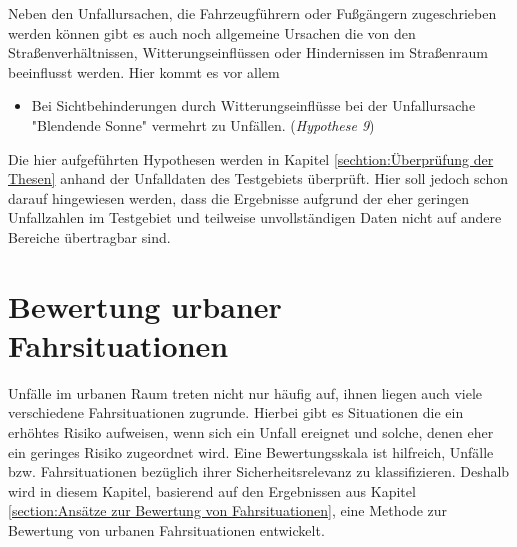 Neben den Unfallursachen, die Fahrzeugführern oder Fußgängern zugeschrieben werden können gibt es auch noch allgemeine Ursachen die von den Straßenverhältnissen, Witterungseinflüssen oder Hindernissen im Straßenraum beeinflusst werden. Hier kommt es vor allem 

\begin{itemize}	
	\item Bei Sichtbehinderungen durch Witterungseinflüsse bei der Unfallursache "Blendende Sonne" vermehrt zu Unfällen. (\textit{Hypothese 9})
\end{itemize}

Die hier aufgeführten Hypothesen werden in Kapitel \ref{sechtion:Überprüfung der Thesen} anhand der Unfalldaten des Testgebiets überprüft. Hier soll jedoch schon darauf hingewiesen werden, dass die Ergebnisse aufgrund der eher geringen Unfallzahlen im Testgebiet und teilweise unvollständigen Daten nicht auf andere Bereiche übertragbar sind. %


\section{Bewertung urbaner Fahrsituationen}\label{section:Bewertung urbaner Fahrsituationen}
Unfälle im urbanen Raum treten nicht nur häufig auf, ihnen liegen auch viele verschiedene Fahrsituationen zugrunde. Hierbei gibt es Situationen die ein erhöhtes Risiko aufweisen, wenn sich ein Unfall ereignet und solche, denen eher ein geringes Risiko zugeordnet wird. Eine Bewertungsskala ist hilfreich, Unfälle bzw. Fahrsituationen bezüglich ihrer Sicherheitsrelevanz zu klassifizieren. Deshalb wird in diesem Kapitel, basierend auf den Ergebnissen aus Kapitel \ref{section:Ansätze zur Bewertung von Fahrsituationen}, eine Methode zur Bewertung von urbanen Fahrsituationen entwickelt.

